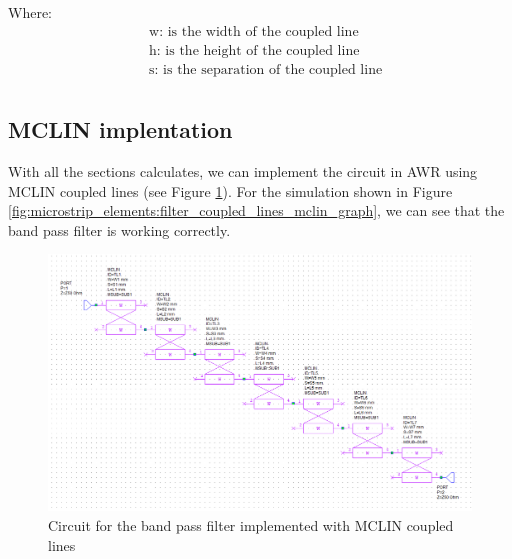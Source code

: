 \documentclass[12pt]{report} %
\begin{document}
Where:
\begin{align*}
    &\text{w: is the width of the coupled line} \\
    &\text{h: is the height of the coupled line} \\
    &\text{s: is the separation of the coupled line} \\
\end{align*}

\subsection{MCLIN implentation}

With all the sections calculates, we can implement the circuit in AWR using MCLIN coupled lines (see Figure \ref{fig:microstrip_elements:fitler_coupled_lines_mclin_circuit}). For the simulation shown in Figure \ref{fig:microstrip_elements:filter_coupled_lines_mclin_graph}, we can see that the band pass filter is working correctly.

\begin{figure}[htbp]
    \centering
    \includegraphics[width=1\linewidth]{images//microstrip_elements/fitler_coupled_lines_mclin_circuit.png}
    \caption{Circuit for the band pass filter implemented with MCLIN coupled lines}
    \label{fig:microstrip_elements:fitler_coupled_lines_mclin_circuit}
\end{figure}
\end{document}
